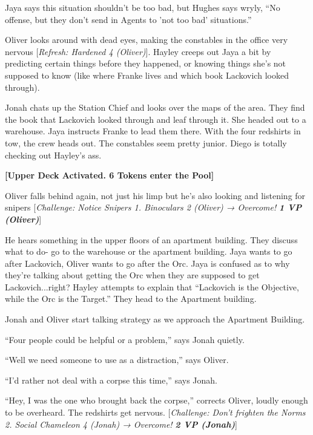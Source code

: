 Jaya says this situation shouldn't be too bad, but Hughes says wryly, ``No offense, but they don't send in Agents to 'not too bad' situations.''



Oliver looks around with dead eyes, making the constables in the office very nervous {[}\textit{Refresh: Hardened 4 (Oliver)}{]}.  Hayley creeps out Jaya a bit by predicting certain things before they happened, or knowing things she's not supposed to know (like where Franke lives and which book Lackovich looked through).



Jonah chats up the Station Chief and looks over the maps of the area.  They find the book that Lackovich looked through and leaf through it.  She headed out to a warehouse.  Jaya instructs Franke to lead them there.  With the four redshirts in tow, the crew heads out.  The constables seem pretty junior.  Diego is totally checking out Hayley's ass. 



\textbf{{[}Upper Deck Activated.  6 Tokens enter the Pool{]}}



Oliver falls behind again, not just his limp but he's also looking and listening for snipers {[}\textit{Challenge: Notice Snipers 1. Binoculars 2 (Oliver) → Overcome! }\textit{\textbf{1 VP (Oliver)}}{]}



He hears something in the upper floors of an apartment building.  They discuss what to do- go to the warehouse or the apartment building.  Jaya wants to go after Lackovich, Oliver wants to go after the Orc.  Jaya is confused as to why they're talking about getting the Orc when they are supposed to get Lackovich...right?  Hayley attempts to explain that ``Lackovich is the Objective, while the Orc is the Target.''  They head to the Apartment building.



Jonah and Oliver start talking strategy as we approach the Apartment Building.

``Four people could be helpful or a problem,'' says Jonah quietly.

``Well we need someone to use as a distraction,'' says Oliver.

``I'd rather not deal with a corpse this time,'' says Jonah.

``Hey, I was the one who brought back the corpse,'' corrects Oliver, loudly enough to be overheard.  The redshirts get nervous.  {[}\textit{Challenge: Don't frighten the Norms 2.  Social Chameleon 4 (Jonah) → Overcome! }\textit{\textbf{2 VP (Jonah)}}{]}



